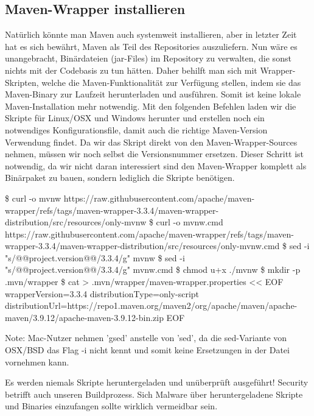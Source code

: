 \subsection{Maven-Wrapper installieren}
Natürlich könnte man Maven auch systemweit installieren, aber in letzter Zeit
hat es sich bewährt, Maven als Teil des Repositories auszuliefern. Nun wäre
es unangebracht, Binärdateien (jar-Files) im Repository zu verwalten, die sonst
nichts mit der Codebasis zu tun hätten. Daher behilft man sich mit 
Wrapper-Skripten, welche die Maven-Funktionalität zur Verfügung stellen, 
indem sie das Maven-Binary zur Laufzeit herunterladen und ausführen. Somit 
ist keine lokale Maven-Installation mehr notwendig.
Mit den folgenden Befehlen laden wir die Skripte für Linux/OSX und Windows
herunter und erstellen noch ein notwendiges Konfigurationsfile, damit auch
die richtige Maven-Version Verwendung findet. Da wir das Skript direkt von
den Maven-Wrapper-Sources nehmen, müssen wir noch selbst die Versionsnummer
ersetzen. Dieser Schritt ist notwendig, da wir nicht daran interessiert sind
den Maven-Wrapper komplett als Binärpaket zu bauen, sondern lediglich die 
Skripte benötigen.

\begin{terminalbox}
    \begin{VerbatimBreak}
\$ curl -o mvnw https://raw.githubusercontent.com/apache/maven-wrapper/refs/tags/maven-wrapper-3.3.4/maven-wrapper-distribution/src/resources/only-mvnw
\$ curl -o mvnw.cmd https://raw.githubusercontent.com/apache/maven-wrapper/refs/tags/maven-wrapper-3.3.4/maven-wrapper-distribution/src/resources/only-mvnw.cmd
\$ sed -i "s/@@project.version@@/3.3.4/g" mvnw
\$ sed -i "s/@@project.version@@/3.3.4/g" mvnw.cmd
\$ chmod u+x ./mvnw
\$ mkdir -p .mvn/wrapper
\$ cat > .mvn/wrapper/maven-wrapper.properties << EOF
wrapperVersion=3.3.4
distributionType=only-script
distributionUrl=https://repo1.maven.org/maven2/org/apache/maven/apache-maven/3.9.12/apache-maven-3.9.12-bin.zip
EOF
\end{VerbatimBreak}
\end{terminalbox}

Note: Mac-Nutzer nehmen 'gsed' anstelle von 'sed', da die sed-Variante von 
OSX/BSD das Flag -i nicht kennt und somit keine Ersetzungen 
in der Datei vornehmen kann.

\begin{rulebox}[label=rule:checkScripts]{Es werden niemals Skripte heruntergeladen
    und unüberprüft ausgeführt!}
Security betrifft auch unseren Buildprozess. Sich Malware über heruntergeladene
Skripte und Binaries einzufangen sollte wirklich vermeidbar sein.
\end{rulebox}

